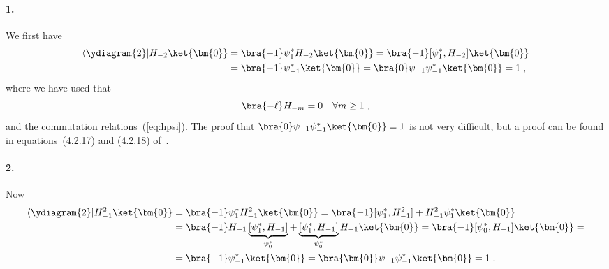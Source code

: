 \paragraph{1.} We first have
\begin{equation}
  \begin{split}
\langle \ydiagram{2}| H_{-2} \ket{\bm{0}} & = \bra{-1} \psi_1^\ast H_{-2} \ket{\bm{0}} = 
\bra{-1} [\psi_1^\ast, H_{-2}] \ket{\bm{0}} \\
& = \bra{-1} \psi_{-1}^\ast\ket{\bm{0}} = \bra{0} \psi_{-1} \psi_{-1}^\ast \ket{\bm{0}} = 1\; , 
  \end{split}
\end{equation}
where we have used that
\begin{equation}
 \bra{-\ell} H_{-m} = 0 \quad \forall m \geq 1\; ,
\end{equation}
and the commutation relations~(\ref{eq:hpsi}). The proof that
\(\bra{0} \psi_{-1} \psi_{-1}^\ast \ket{\bm{0}} = 1\)  is not very difficult, but a proof can be found in
equations~(4.2.17) and (4.2.18) of~\cite{Wheeler:2010vmq}.

\paragraph{2.} Now
\begin{equation}
  \begin{split}
    \langle \ydiagram{2}| H_{-1}^2 \ket{\bm{0}} & = \bra{-1} \psi_1^\ast H_{-1}^2 \ket{\bm{0}} = 
    \bra{-1} [\psi_1^\ast, H_{-1}^2] + H_{-1}^2  \psi_1^\ast\ket{\bm{0}} \\
    & = \bra{-1} H_{-1}\underbrace{[\psi_1^\ast, H_{-1}]}_{\psi^\ast_0} +
    \underbrace{[\psi_1^\ast, H_{-1}]}_{\psi_0^\ast} H_{-1}  \ket{\bm{0}}
     = \bra{-1} [\psi_0^\ast, H_{-1}]  \ket{\bm{0}} =  \\
     &= \bra{-1} \psi_{-1}^\ast  \ket{\bm{0}} = \bra{\bm{0}} \psi_{-1} \psi_{-1}^\ast  \ket{\bm{0}} =  1\; .
  \end{split}
\end{equation}


